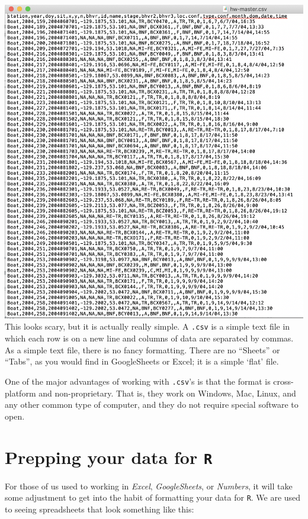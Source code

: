 \documentclass[]{book}
\begin{document}
\includegraphics{img/csv_text_editor.png}
This looks scary, but it is actually really simple. A \texttt{.csv} is a simple text file in which each row is on a new line and columns of data are separated by commas. As a simple text file, there is no fancy formatting. There are no ``Sheets'' or ``Tabs'', as you would find in GoogleSheets or Excel; it is a simple `flat' file.

One of the major advantages of working with \texttt{.csv}'s is that the format is cross-platform and non-proprietary. That is, they work on Windows, Mac, Linux, and any other common type of computer, and they do not require special software to open.

\hypertarget{prepping-your-data-for-r}{%
\section*{\texorpdfstring{Prepping your data for \texttt{R}}{Prepping your data for R}}\label{prepping-your-data-for-r}}

For those of us used to working in \emph{Excel}, \emph{GoogleSheets}, or \emph{Numbers}, it will take some adjustment to get into the habit of formatting your data for \texttt{R}. We are used to seeing spreadsheets that look something like this:
\end{document}
